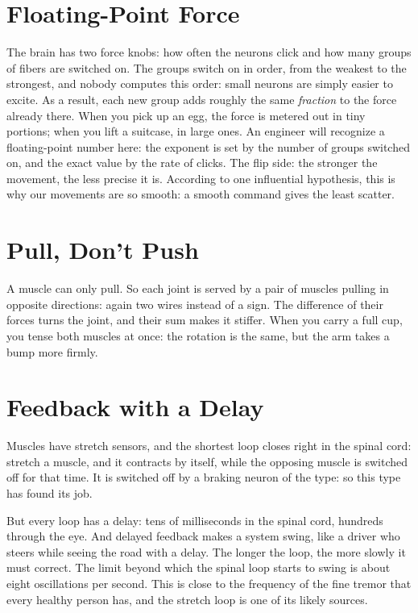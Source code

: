 \section*{Floating-Point Force}

The brain has two force knobs: how often the neurons click and how many groups of fibers are switched on. The groups switch on in order, from the weakest to the strongest, and nobody computes this order: small neurons are simply easier to excite. As a result, each new group adds roughly the same \emph{fraction} to the force already there. When you pick up an egg, the force is metered out in tiny portions; when you lift a suitcase, in large ones. An engineer will recognize a floating-point number here: the exponent is set by the number of groups switched on, and the exact value by the rate of clicks. The flip side: the stronger the movement, the less precise it is. According to one influential hypothesis, this is why our movements are so smooth: a smooth command gives the least scatter.

\section*{Pull, Don't Push}

A muscle can only pull. So each joint is served by a pair of muscles pulling in opposite directions: again two wires instead of a sign. The difference of their forces turns the joint, and their sum makes it stiffer. When you carry a full cup, you tense both muscles at once: the rotation is the same, but the arm takes a bump more firmly.


\section*{Feedback with a Delay}

Muscles have stretch sensors, and the shortest loop closes right in the spinal cord: stretch a muscle, and it contracts by itself, while the opposing muscle is switched off for that time. It is switched off by a braking neuron of the  type: so this type has found its job.

But every loop has a delay: tens of milliseconds in the spinal cord, hundreds through the eye. And delayed feedback makes a system swing, like a driver who steers while seeing the road with a delay. The longer the loop, the more slowly it must correct. The limit beyond which the spinal loop starts to swing is about eight oscillations per second. This is close to the frequency of the fine tremor that every healthy person has, and the stretch loop is one of its likely sources.

